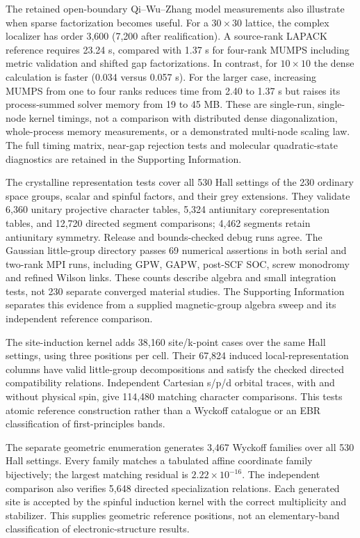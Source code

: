 The retained open-boundary Qi--Wu--Zhang model measurements also
illustrate when sparse factorization becomes useful. For a
$30\times30$ lattice, the complex localizer has order 3,600
(7,200 after realification). A source-rank LAPACK reference requires
23.24 s, compared with 1.37 s for four-rank MUMPS including metric
validation and shifted gap factorizations. In contrast, for
$10\times10$ the dense calculation is faster (0.034 versus 0.057 s).
For the larger case, increasing MUMPS from one to four ranks reduces
time from 2.40 to 1.37 s but raises its process-summed solver memory
from 19 to 45 MB. These are single-run, single-node kernel timings,
not a comparison with distributed dense diagonalization, whole-process
memory measurements, or a demonstrated multi-node scaling law.
The full timing matrix, near-gap rejection tests and molecular
quadratic-state diagnostics are retained in the Supporting Information.

The crystalline representation tests cover all 530 Hall settings of
the 230 ordinary space groups, scalar and spinful factors, and their
grey extensions. They validate 6,360 unitary projective character
tables, 5,324 antiunitary corepresentation tables, and 12,720 directed
segment comparisons; 4,462 segments retain antiunitary symmetry.
Release and bounds-checked debug runs agree. The Gaussian
little-group directory passes 69 numerical assertions in both serial
and two-rank MPI runs, including GPW, GAPW, post-SCF SOC, screw
monodromy and refined Wilson links. These counts describe algebra and
small integration tests, not 230 separate converged material studies.
The Supporting Information separates this evidence from a supplied
magnetic-group algebra sweep and its independent reference comparison.

The site-induction kernel adds 38,160 site/k-point cases over the same
Hall settings, using three positions per cell. Their 67,824 induced
local-representation columns have valid little-group decompositions
and satisfy the checked directed compatibility relations.
Independent Cartesian s/p/d orbital traces, with and without physical
spin, give 114,480 matching character comparisons. This tests atomic
reference construction rather than a Wyckoff catalogue or an EBR
classification of first-principles bands.

The separate geometric enumeration generates 3,467 Wyckoff families
over all 530 Hall settings. Every family matches a tabulated affine
coordinate family bijectively; the largest matching residual is
$2.22\times10^{-16}$. The independent comparison also verifies 5,648
directed specialization relations. Each generated site is accepted
by the spinful induction kernel with the correct multiplicity and
stabilizer. This supplies geometric reference positions, not an
elementary-band classification of electronic-structure results.

